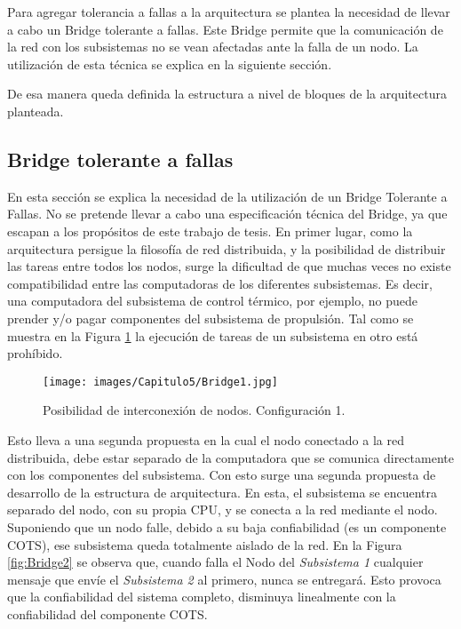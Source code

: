 Para agregar tolerancia a fallas a la arquitectura se plantea la necesidad de 
llevar a cabo un Bridge tolerante a fallas. Este Bridge permite que la comunicación de la red
con los subsistemas no se vean afectadas ante la falla de un nodo. La utilización
de esta técnica se explica en la siguiente sección.

De esa manera queda definida la estructura a nivel de bloques de la arquitectura
planteada. 

\subsection{Bridge tolerante a fallas}\label{subsec:bridge}
En esta sección se explica la necesidad de la utilización de un Bridge 
Tolerante a Fallas. No se pretende llevar a cabo una especificación técnica
del Bridge, ya que escapan a los propósitos de este trabajo de tesis. 
En primer lugar, como la arquitectura persigue la filosofía de red distribuida, 
y la posibilidad de distribuir las tareas entre todos los nodos, surge la 
dificultad de que muchas veces no existe compatibilidad entre las computadoras 
de los diferentes subsistemas. Es decir, una computadora del subsistema 
de control térmico, por ejemplo, no puede prender y/o pagar componentes del 
subsistema de propulsión. Tal como se muestra en la Figura \ref{fig:Bridge1} la 
ejecución de tareas de un subsistema en otro está prohíbido. 

\begin{figure}[h!]
 \centering
 \texttt{[image: images/Capitulo5/Bridge1.jpg]}
  \caption{Posibilidad de interconexión de nodos. Configuración 1.}
\label{fig:Bridge1}
\end{figure} 

Esto lleva a una segunda propuesta en la cual el nodo conectado 
a la red distribuida, debe estar separado de la computadora que 
se comunica directamente con los componentes del subsistema. Con esto
surge una segunda propuesta de desarrollo de la estructura de arquitectura.
En esta, el subsistema se encuentra separado del nodo, con su propia CPU, y se conecta
a la red mediante el nodo. Suponiendo que un nodo falle,
 debido a su baja confiabilidad (es un componente COTS), ese subsistema queda totalmente
aislado de la red. En la Figura \ref{fig:Bridge2} se observa que, cuando falla el Nodo
del \textit{Subsistema 1} cualquier mensaje que envíe el \textit{Subsistema 2} al primero, 
nunca se entregará. Esto provoca que la confiabilidad del sistema completo, disminuya 
linealmente con la confiabilidad del componente COTS. 

